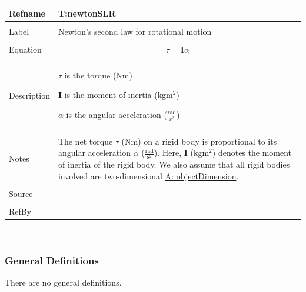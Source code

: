 \documentclass[12pt]{article}
\begin{document}
\noindent \begin{minipage}{\textwidth}
\begin{tabular}{p{} p{}}
\toprule \textbf{Refname} & \textbf{T:newtonSLR}
\label{T:newtonSLR}
\\ \midrule \\
Label & Newton's second law for rotational motion
\\ \midrule \\
Equation & \begin{dmath}
           τ=\mathbf{I} α
           \end{dmath}
\\ \midrule \\
Description & \begin{symbDescription}
              \item{$τ$ is the torque (Nm)}
              \item{$\mathbf{I}$ is the moment of inertia (kg$\text{m}^{2}$)}
              \item{$α$ is the angular acceleration ($\frac{\text{rad}}{\text{s}^{2}}$)}
              \end{symbDescription}
\\ \midrule \\
Notes & The net torque $τ$ (Nm) on a rigid body is proportional to its angular acceleration $α$ ($\frac{\text{rad}}{\text{s}^{2}}$). Here, $\mathbf{I}$ (kg$\text{m}^{2}$) denotes the moment of inertia of the rigid body. We also assume that all rigid bodies involved are two-dimensional \hyperref[A:objectDimension]{A: objectDimension}.
\\ \midrule \\
Source & 
\\ \midrule \\
RefBy & 
\\ \bottomrule \end{tabular}
\end{minipage}\\
\subsubsection{General Definitions}
\label{Sec:GDs}
There are no general definitions.
\end{document}
